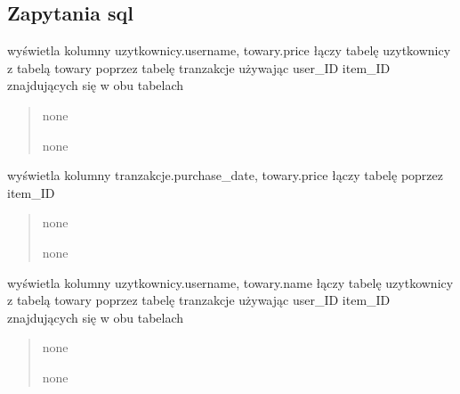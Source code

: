 \documentclass[letterpaper,10pt,polish]{sphinxmanual}
\begin{document}
\subsection{Zapytania sql}
\label{\detokenize{rozdzial4/index:zapytania-sql}}

\begin{fulllineitems}

\pysigstartsignatures
{}
\pysigstopsignatures
\sphinxAtStartPar
wyświetla kolumny uzytkownicy.username, towary.price łączy tabelę uzytkownicy z tabelą towary poprzez tabelę tranzakcje używając user\_ID item\_ID znajdujących się w obu tabelach
\begin{quote}\begin{description}
\sphinxAtStartPar
none

\sphinxAtStartPar
none

\end{description}\end{quote}

\end{fulllineitems}



\begin{fulllineitems}

\pysigstartsignatures
{}
\pysigstopsignatures
\sphinxAtStartPar
wyświetla kolumny tranzakcje.purchase\_date, towary.price łączy tabelę poprzez item\_ID
\begin{quote}\begin{description}
\sphinxAtStartPar
none

\sphinxAtStartPar
none

\end{description}\end{quote}

\end{fulllineitems}



\begin{fulllineitems}

\pysigstartsignatures
{}
\pysigstopsignatures
\sphinxAtStartPar
wyświetla kolumny uzytkownicy.username, towary.name łączy tabelę uzytkownicy z tabelą towary poprzez tabelę tranzakcje używając user\_ID item\_ID znajdujących się w obu tabelach
\begin{quote}\begin{description}
\sphinxAtStartPar
none

\sphinxAtStartPar
none

\end{description}\end{quote}

\end{fulllineitems}
\end{document}
